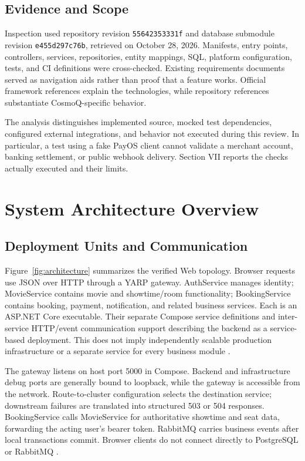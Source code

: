 \documentclass[conference]{IEEEtran}
\newcommand{\code}[1]{\texttt{#1}}
\begin{document}
\subsection{Evidence and Scope}
Inspection used repository revision \code{55642353331f} and database submodule
revision \code{e455d297c76b}, retrieved on October 28, 2026. Manifests,
entry points, controllers, services, repositories, entity mappings, SQL,
platform configuration, tests, and CI definitions were cross-checked. Existing
requirements documents served as navigation aids rather than proof that a
feature works. Official framework references explain the technologies, while
repository references substantiate CosmoQ-specific behavior.

The analysis distinguishes implemented source, mocked test dependencies,
configured external integrations, and behavior not executed during this review.
In particular, a test using a fake PayOS client cannot validate a merchant
account, banking settlement, or public webhook delivery. Section VII reports
the checks actually executed and their limits.

\section{System Architecture Overview}
\subsection{Deployment Units and Communication}
Figure~\ref{fig:architecture} summarizes the verified Web topology. Browser
requests use JSON over HTTP through a YARP gateway. AuthService manages identity;
MovieService contains movie and showtime/room functionality; BookingService
contains booking, payment, notification, and related business services. Each is
an ASP.NET Core executable. Their separate Compose service definitions and
inter-service HTTP/event communication support describing the backend as a
service-based deployment. This does not imply independently scalable production
infrastructure or a separate service for every business module
\cite{gateway,movie,booking,deployment}.



The gateway listens on host port 5000 in Compose. Backend and infrastructure
debug ports are generally bound to loopback, while the gateway is accessible
from the network. Route-to-cluster configuration selects the destination
service; downstream failures are translated into structured 503 or 504 responses.
BookingService calls MovieService for authoritative showtime and seat data,
forwarding the acting user's bearer token. RabbitMQ carries business events
after local transactions commit. Browser clients do not connect directly to
PostgreSQL or RabbitMQ \cite{gateway,booking,deployment}.
\end{document}
